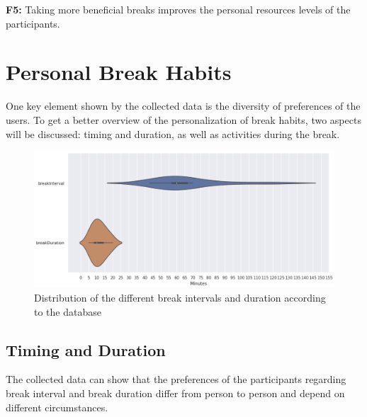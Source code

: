 \documentclass{hasel_thesis}
\begin{document}
\begin{tcolorbox}[colback=white!5!white,colframe=black!75!black]
 \textbf{F5:} Taking more beneficial breaks improves the personal resources levels of the participants.
\end{tcolorbox}


\section{Personal Break Habits} \label{personal_break_habits}

One key element shown by the collected data is the diversity of preferences of the users. To get a better overview of the personalization of break habits, two aspects will be discussed: timing and duration, as well as activities during the break.


\begin{figure}[htp]
    \centering
    \includegraphics[width=14cm]{hasel_thesis/images/break_Interval_Duration.png}
    \caption{Distribution of the different break intervals and duration according to the database}
    \label{fig:interval_duration}
\end{figure}


\subsection{Timing and Duration}
The collected data can show that the preferences of the participants regarding break interval and break duration differ from person to person and depend on different circumstances. 
\end{document}
